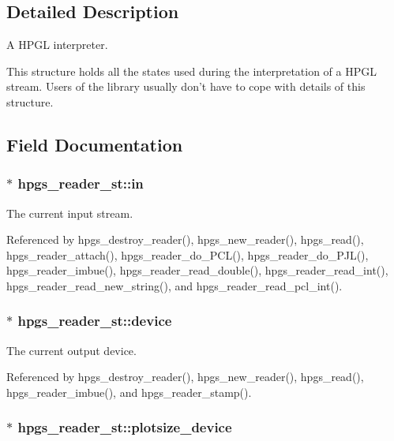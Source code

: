 \subsection{Detailed Description}
A HPGL interpreter. 

This structure holds all the states used during the interpretation of a HPGL stream. Users of the library usually don't have to cope with details of this structure. 

\subsection{Field Documentation}
\subsubsection[in]{$\ast$ {\bf hpgs\_\-reader\_\-st::in}}\label{structhpgs__reader__st_0820ac4de3db8f395d3a09682560a82d}


The current input stream. 

Referenced by hpgs\_\-destroy\_\-reader(), hpgs\_\-new\_\-reader(), hpgs\_\-read(), hpgs\_\-reader\_\-attach(), hpgs\_\-reader\_\-do\_\-PCL(), hpgs\_\-reader\_\-do\_\-PJL(), hpgs\_\-reader\_\-imbue(), hpgs\_\-reader\_\-read\_\-double(), hpgs\_\-reader\_\-read\_\-int(), hpgs\_\-reader\_\-read\_\-new\_\-string(), and hpgs\_\-reader\_\-read\_\-pcl\_\-int().
\subsubsection[device]{$\ast$ {\bf hpgs\_\-reader\_\-st::device}}\label{structhpgs__reader__st_638ea28d18384d24ac73eca74675b3e1}


The current output device. 

Referenced by hpgs\_\-destroy\_\-reader(), hpgs\_\-new\_\-reader(), hpgs\_\-read(), hpgs\_\-reader\_\-imbue(), and hpgs\_\-reader\_\-stamp().
\subsubsection[plotsize\_\-device]{$\ast$ {\bf hpgs\_\-reader\_\-st::plotsize\_\-device}}\label{structhpgs__reader__st_0c17198587a3b759bf04fef35a687dbf}


